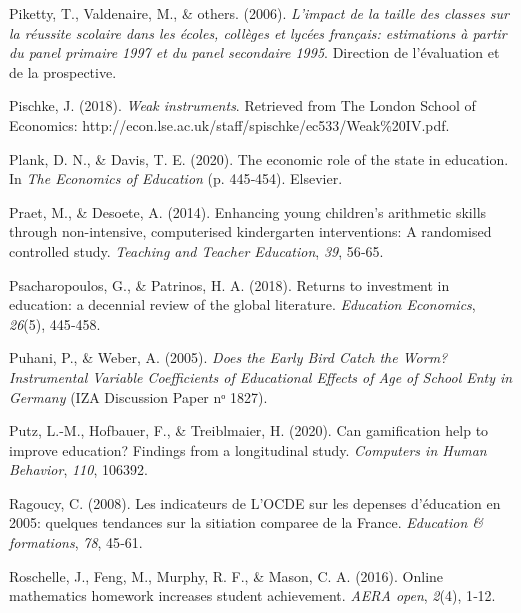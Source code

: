 \documentclass[
]{book}
\newlength{\cslhangindent}
\newlength{\cslentryspacingunit} %
\newenvironment{CSLReferences}[2] %
 {%
  \setlength{\parindent}{0pt}
  \ifodd #1
  \let\oldpar\par
  \def\par{\hangindent=\cslhangindent\oldpar}
  \fi
  \setlength{\parskip}{#2\cslentryspacingunit}
 }%
 {}
\begin{document}
\begin{CSLReferences}{1}{2}
\leavevmode{}%
Piketty, T., Valdenaire, M., \& others. (2006). \emph{L'impact de la taille des classes sur la r{é}ussite scolaire dans les {é}coles, coll{è}ges et lyc{é}es fran{ç}ais: estimations {à} partir du panel primaire 1997 et du panel secondaire 1995}. Direction de l'{é}valuation et de la prospective.

\leavevmode{}%
Pischke, J. (2018). \emph{Weak instruments}. Retrieved from The London School of Economics: http://econ.lse.ac.uk/staff/spischke/ec533/Weak\%20IV.pdf.

\leavevmode{}%
Plank, D. N., \& Davis, T. E. (2020). The economic role of the state in education. In \emph{The Economics of Education} (p. 445‑454). Elsevier.

\leavevmode{}%
Praet, M., \& Desoete, A. (2014). Enhancing young children's arithmetic skills through non-intensive, computerised kindergarten interventions: A randomised controlled study. \emph{Teaching and Teacher Education}, \emph{39}, 56‑65.

\leavevmode{}%
Psacharopoulos, G., \& Patrinos, H. A. (2018). Returns to investment in education: a decennial review of the global literature. \emph{Education Economics}, \emph{26}(5), 445‑458.

\leavevmode{}%
Puhani, P., \& Weber, A. (2005). \emph{Does the Early Bird Catch the Worm? Instrumental Variable Coefficients of Educational Effects of Age of School Enty in Germany} (IZA Discussion Paper nᵒ 1827).

\leavevmode{}%
Putz, L.-M., Hofbauer, F., \& Treiblmaier, H. (2020). Can gamification help to improve education? Findings from a longitudinal study. \emph{Computers in Human Behavior}, \emph{110}, 106392.

\leavevmode{}%
Ragoucy, C. (2008). Les indicateurs de L'OCDE sur les depenses d'éducation en 2005: quelques tendances sur la sitiation comparee de la France. \emph{Education \& formations}, \emph{78}, 45‑61.

\leavevmode{}%
Roschelle, J., Feng, M., Murphy, R. F., \& Mason, C. A. (2016). Online mathematics homework increases student achievement. \emph{AERA open}, \emph{2}(4), 1‑12.


\end{CSLReferences}
\end{document}
